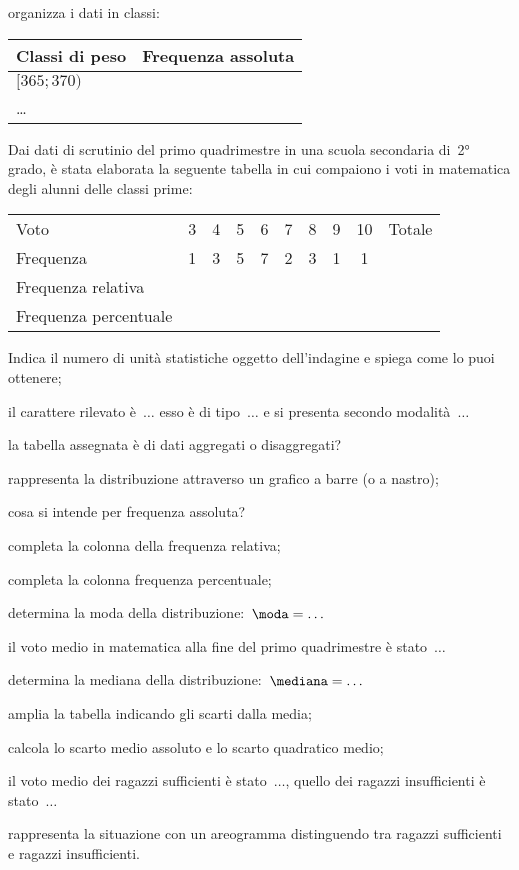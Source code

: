 \begin{esercizio}
\begin{enumeratea}
\item organizza i dati in classi:
\begin{center}
\begin{tabular}{lc}
\toprule
Classi di peso & Frequenza assoluta\\
\midrule
$[365; 370)$ & \\
\ldots & \\
\bottomrule
\end{tabular}
\end{center}
\end{enumeratea}
\end{esercizio}

\begin{esercizio}
\label{ese:A.47}
Dai dati di scrutinio del primo quadrimestre in una scuola secondaria di~2° 
grado, è stata elaborata la seguente tabella in cui compaiono i voti in 
matematica degli alunni delle classi prime:
\begin{center}
\begin{tabular}{l*{9}{c}}
\toprule
Voto&3 &4 &5 &6 &7 &8 &9 &10 &Totale\\
Frequenza &1&3&5&7&2&3&1&1&\\
Frequenza relativa&&&&&&&&&\\
Frequenza percentuale&&&&&&&&&\\
\bottomrule
\end{tabular}
\end{center}
\begin{enumeratea}
 \item Indica il numero di unità statistiche oggetto dell'indagine e spiega 
come lo puoi ottenere;
 \item il carattere rilevato è~$\dots$ esso è di tipo~$\dots$ e si presenta 
secondo modalità~$\dots$
 \item la tabella assegnata è di dati aggregati o disaggregati?
 \item rappresenta la distribuzione attraverso un grafico a barre (o a 
nastro);
 \item cosa si intende per frequenza assoluta?
 \item completa la colonna della frequenza relativa;
 \item completa la colonna frequenza percentuale;
 \item determina la moda della distribuzione:~$\moda = \dots$
 \item il voto medio in matematica alla fine del primo quadrimestre è 
stato~$\dots$
 \item determina la mediana della distribuzione:~$\mediana= \dots$
 \item amplia la tabella indicando gli scarti dalla media;
 \item calcola lo scarto medio assoluto e lo scarto quadratico medio;
 \item il voto medio dei ragazzi sufficienti è stato~$\dots$, quello dei 
ragazzi insufficienti è stato~$\dots$
 \item rappresenta la situazione con un areogramma distinguendo tra ragazzi 
sufficienti e ragazzi insufficienti.
 \end{enumeratea}
\end{esercizio}

